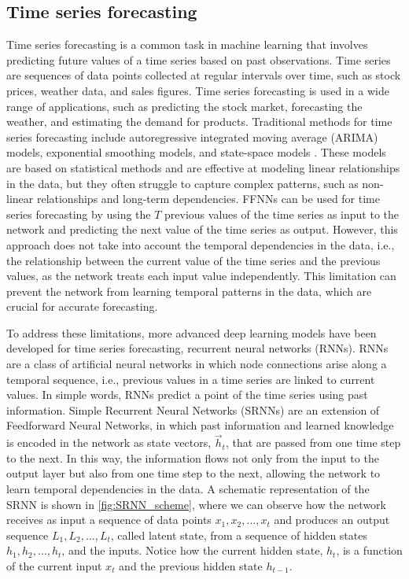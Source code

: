 \subsection{\label{sec:Time-series forecasting} Time series forecasting}

Time series forecasting is a common task in machine learning that involves
predicting future values of a time series based on past observations. Time
series are sequences of data points collected at regular intervals over time,
such as stock prices, weather data, and sales figures. Time series forecasting
is used in a wide range of applications, such as predicting the stock market,
forecasting the weather, and estimating the demand for products. Traditional
methods for time series forecasting include autoregressive integrated moving
average (ARIMA) models, exponential smoothing models, and state-space models
\cite{Hyndman2018}. These models are based on statistical methods and are
effective at modeling linear relationships in the data, but they often
struggle to capture complex patterns, such as non-linear relationships and
long-term dependencies. FFNNs can be used for time series forecasting by using
the $T$
previous values of the time series as input to the network and predicting the
next value of the time series as output. However, this approach does not take
into account the temporal dependencies in the data, i.e., the relationship
between the current value of the time series and the previous values, as the
network treats each input value independently. This limitation can prevent
the
network from learning temporal patterns in the data, which are crucial for
accurate forecasting.

To address these limitations, more advanced deep learning models have been
developed for time series forecasting, recurrent neural networks (RNNs). RNNs
are a class of artificial neural networks in which node connections arise
along
a temporal sequence, i.e., previous values in a time series are linked to
current values. In simple words, RNNs predict a point of the time series
using
past information. Simple Recurrent Neural Networks (SRNNs) are an extension
of
Feedforward Neural Networks, in which past information and learned knowledge
is
encoded in the network as state vectors, $\vec{h}_t$, that are passed from
one
time step to the next. In this way, the information flows not only from the
input to the output layer but also from one time step to the next,
allowing the network to learn temporal dependencies in the data. A schematic
representation of the SRNN is shown in \cref{fig:SRNN_scheme}, where we can
observe how the network receives as input a sequence of data points $x_1,
  x_2,
  \ldots, x_t$ and produces an output sequence $L_1, L_2, \ldots, L_t$, called
latent state, from a sequence of hidden states $h_1, h_2, \ldots, h_t$, and
the
inputs. Notice how the current hidden state, $h_t$, is a function of the
current input $x_{t}$ and the previous hidden state $h_{t-1}$.

